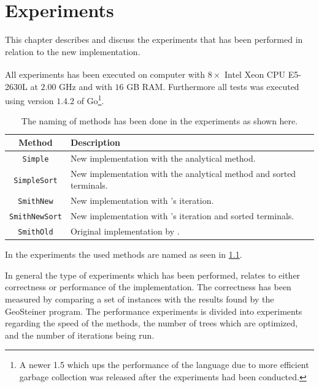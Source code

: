{
\abnormalparskip{0pt}
\chapter{Experiments}
\label{cha:experiments}
}

This chapter describes and discuss the experiments that has been performed in
relation to the new implementation.

All experiments has been executed on computer with $8 \times$ Intel\textsuperscript{\textregistered}
Xeon\textsuperscript{\textregistered} CPU E5-2630L at $2.00$ GHz and with $16$ GB
RAM. Furthermore all tests was executed using version $1.4.2$ of Go\footnote{A newer 1.5
which ups the performance of the language due to more efficient garbage
collection was released after the experiments had been conducted.}.
%
\begin{table}[htbp]
  \centering
  \begin{tabular}{cp{9cm}}
    \toprule
    Method       & Description                                      \\
    \midrule
    \texttt{Simple}       & New implementation with the analytical method.   \\
    \texttt{SimpleSort}   & New implementation with the analytical method and sorted
                   terminals.                                       \\
    \texttt{SmithNew}     & New implementation with \citeauthor{smith1992}'s
                   iteration.                                       \\
    \texttt{SmithNewSort} & New implementation with \citeauthor{smith1992}'s iteration
                   and sorted terminals.                            \\
    \texttt{SmithOld}     & Original implementation by \textcite{smith1992}. \\
    \bottomrule
  \end{tabular}
  \caption[Naming of methods]{The naming of methods has been done in the
    experiments as shown here.\label{tab:method-names}}
\end{table}
%
In the experiments the used methods are named as seen in
\cref{tab:method-names}.

In general the type of experiments which has been performed, relates to either
correctness or performance of the implementation. The correctness has been
measured by comparing a set of instances with the results found by the
GeoSteiner program. The performance experiments is divided into experiments
regarding the speed of the methods, the number of trees which are optimized, and
the number of iterations being run. 


